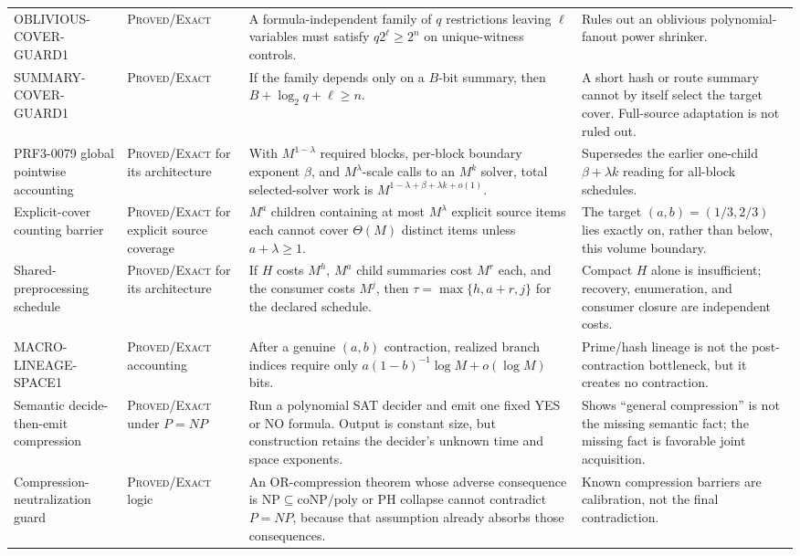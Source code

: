 \documentclass[10pt]{article}
\newcommand{\Exact}{\textsc{Proved/Exact}}
\begin{document}
\begin{longtable}{L{0.20\textwidth}L{0.18\textwidth}L{0.27\textwidth}L{0.29\textwidth}}
OBLIVIOUS-COVER-GUARD1 & \Exact{} &
A formula-independent family of $q$ restrictions leaving $\ell$ variables
must satisfy $q2^\ell\ge2^n$ on unique-witness controls. & Rules out an
oblivious polynomial-fanout power shrinker. \\

SUMMARY-COVER-GUARD1 & \Exact{} &
If the family depends only on a $B$-bit summary, then
$B+\log_2q+\ell\ge n$. & A short hash or route summary cannot by itself select
the target cover.  Full-source adaptation is not ruled out. \\

PRF3-0079 global pointwise accounting & \Exact{} for its architecture &
With $M^{1-\lambda}$ required blocks, per-block boundary exponent $\beta$,
and $M^\lambda$-scale calls to an $M^k$ solver, total selected-solver work is
$M^{1-\lambda+\beta+\lambda k+o(1)}$. & Supersedes the earlier one-child
$\beta+\lambda k$ reading for all-block schedules. \\

Explicit-cover counting barrier & \Exact{} for explicit source coverage &
$M^a$ children containing at most $M^\lambda$ explicit source items each
cannot cover $\Theta(M)$ distinct items unless $a+\lambda\ge1$. & The target
$(a,b)=(1/3,2/3)$ lies exactly on, rather than below, this volume boundary. \\

Shared-preprocessing schedule & \Exact{} for its architecture &
If $H$ costs $M^h$, $M^a$ child summaries cost $M^r$ each, and the consumer
costs $M^j$, then $\tau=\max\{h,a+r,j\}$ for the declared schedule. & Compact
$H$ alone is insufficient; recovery, enumeration, and consumer closure are
independent costs. \\

MACRO-LINEAGE-SPACE1 & \Exact{} accounting &
After a genuine $(a,b)$ contraction, realized branch indices require only
$a(1-b)^{-1}\log M+o(\log M)$ bits. & Prime/hash lineage is not the
post-contraction bottleneck, but it creates no contraction. \\

Semantic decide-then-emit compression & \Exact{} under $P=NP$ &
Run a polynomial SAT decider and emit one fixed YES or NO formula.  Output is
constant size, but construction retains the decider's unknown time and space
exponents. & Shows ``general compression'' is not the missing semantic fact;
the missing fact is favorable joint acquisition. \\

Compression-neutralization guard & \Exact{} logic &
An OR-compression theorem whose adverse consequence is
$\mathrm{NP}\subseteq\mathrm{coNP/poly}$ or PH collapse cannot contradict
$P=NP$, because that assumption already absorbs those consequences. & Known
compression barriers are calibration, not the final contradiction. \\

\end{longtable}
\normalsize
\end{document}
